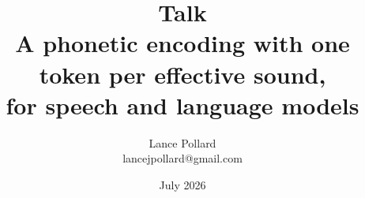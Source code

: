 \setlength{\itemsep}{0pt}


\onehalfspacing

\theoremheaderfont{\bfseries}
\theorembodyfont{\normalfont}
\newtheorem{definition}{Definition}
\newtheorem{principle}{Principle}

\makeatletter
\def\@begintheorem#1#2#3{%
  \par\addvspace{1em}%
  \noindent\textbf{#1 #2.}
  \ifx\@empty#3\relax
    \quad
  \else
    \ \textbf{#3:}
  \fi
  \hspace{0.5em}
}
\def\@endtheorem{\par}
\makeatother

\newcommand{\code}[1]{\texttt{#1}}

\newcommand{\cmt}[1]{\textcolor{codecomment}{#1}}

\title{
  {\huge \textbf{Talk}} \\[3mm]
  \large A phonetic encoding with one token per effective sound, \\ for speech and language models
}
\author{Lance Pollard \\ \small lancejpollard@gmail.com}
\date{July 2026}
